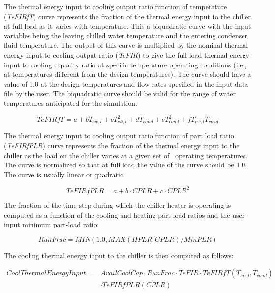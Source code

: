 The thermal energy input to cooling output ratio function of temperature (\emph{TeFIRfT}) curve represents the fraction of the thermal energy input to the chiller at full load as it varies with temperature. This a biquadratic curve with the input variables being the leaving chilled water temperature and the entering condenser fluid temperature. The output of this curve is multiplied by the nominal thermal energy input to cooling output ratio (\emph{TeFIR}) to give the full-load thermal energy input to cooling capacity ratio at specific temperature operating conditions (i.e., at temperatures different from the design temperatures). The curve should have a value of 1.0 at the design temperatures and flow rates specified in the input data file by the user. The biquadratic curve should be valid for the range of water temperatures anticipated for the simulation.

\begin{equation}
TeFIRfT = a + b{T_{cw,l}} + cT_{cw,l}^2 + d{T_{cond}} + eT_{cond}^2 + f{T_{cw,l}}{T_{cond}}
\end{equation}

The thermal energy input to cooling output ratio function of part load ratio (\emph{TeFIRfPLR}) curve represents the fraction of the thermal energy input to the chiller as the load on the chiller varies at a given set of~ operating temperatures. The curve is normalized so that at full load the value of the curve should be 1.0. The curve is usually linear or quadratic.

\begin{equation}
TeFIRfPLR = a + b \cdot CPLR + c \cdot CPL{R^2}
\end{equation}

The fraction of the time step during which the chiller heater is operating is computed as a function of the cooling and heating part-load ratios and the user-input minimum part-load ratio:

\begin{equation}
RunFrac = MIN(1.0,MAX\left( {HPLR,CPLR} \right)/MinPLR)
\end{equation}

The cooling thermal energy input to the chiller is then computed as follows:

\begin{equation}
\begin{split}
CoolThermalEnergyInput =& AvailCoolCap \cdot RunFrac \cdot TeFIR \cdot TeFIRfT\left( {{T_{cw,l}},{T_{cond}}} \right) \\
&\cdot TeFIRfPLR(CPLR)
\end{split}
\end{equation}

